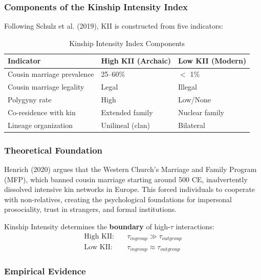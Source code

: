 \subsubsection{Components of the Kinship Intensity Index}

Following Schulz et al. (2019), KII is constructed from five indicators:

\begin{table}[htbp]
\centering
\caption{Kinship Intensity Index Components}
\label{tab:kii-components}
\renewcommand{\arraystretch}{1.2}
\begin{tabular}{@{}p{4cm}p{4cm}p{4cm}@{}}
\toprule
\textbf{Indicator} & \textbf{High KII (Archaic)} & \textbf{Low KII (Modern)} \\
\midrule
Cousin marriage prevalence & 25--60\% & $<$ 1\% \\
Cousin marriage legality & Legal & Illegal \\
Polygyny rate & High & Low/None \\
Co-residence with kin & Extended family & Nuclear family \\
Lineage organization & Unilineal (clan) & Bilateral \\
\bottomrule
\end{tabular}
\end{table}

\subsubsection{Theoretical Foundation}

Henrich (2020) argues that the Western Church's Marriage and Family Program (MFP), which banned cousin marriage starting around 500 CE, inadvertently dissolved intensive kin networks in Europe. This forced individuals to cooperate with non-relatives, creating the psychological foundations for impersonal prosociality, trust in strangers, and formal institutions.

\begin{proposition}
\label{prop:kii-scope}
Kinship Intensity determines the \textbf{boundary} of high-$\tau$ interactions:
\begin{align}
\text{High KII:} \quad &\tau_{ingroup} \gg \tau_{outgroup} \\
\text{Low KII:} \quad &\tau_{ingroup} \approx \tau_{outgroup}
\end{align}
\end{proposition}

\subsubsection{Empirical Evidence}

